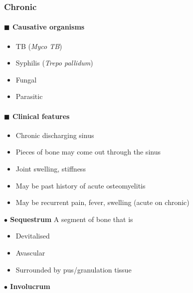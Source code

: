 \documentclass[
  14pt,
]{extarticle}
\providecommand{\tightlist}{%
  \setlength{\itemsep}{0pt}\setlength{\parskip}{0pt}}
\begin{document}
\hypertarget{chronic}{%
\subsubsection{Chronic}\label{chronic}}

\hypertarget{blacksquare-causative-organisms-1}{%
\paragraph{\texorpdfstring{\(\blacksquare\) Causative
organisms}{\textbackslash blacksquare Causative organisms}}\label{blacksquare-causative-organisms-1}}

\begin{itemize}
\tightlist
\item
  TB (\emph{Myco TB})
\item
  Syphilis (\emph{Trepo pallidum})
\item
  Fungal
\item
  Parasitic
\end{itemize}

\hypertarget{blacksquare-clinical-features-1}{%
\paragraph{\texorpdfstring{\(\blacksquare\) Clinical
features}{\textbackslash blacksquare Clinical features}}\label{blacksquare-clinical-features-1}}

\begin{itemize}
\tightlist
\item
  Chronic discharging sinus
\item
  Pieces of bone may come out through the sinus
\item
  Joint swelling, stiffness
\item
  May be past history of acute osteomyelitis
\item
  May be recurrent pain, fever, swelling (acute on chronic)
\end{itemize}

\textbf{\(\bullet\) Sequestrum} A segment of bone that is

\begin{itemize}
\tightlist
\item
  Devitalised
\item
  Avascular
\item
  Surrounded by pus/granulation tissue
\end{itemize}

\textbf{\(\bullet\) Involucrum}
\end{document}
